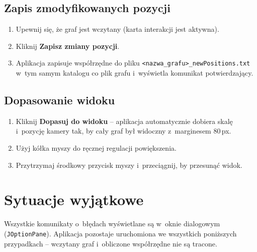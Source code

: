 \documentclass[12pt,a4paper]{article}
\begin{document}
\subsection{Zapis zmodyfikowanych pozycji}
\begin{enumerate}
    \item Upewnij się, że graf jest wczytany (karta interakcji jest aktywna).
    \item Kliknij \textbf{Zapisz zmiany pozycji}.
    \item Aplikacja zapisuje współrzędne do pliku \texttt{<nazwa\_grafu>\_newPositions.txt} w~tym samym katalogu co plik grafu i~wyświetla komunikat potwierdzający.
\end{enumerate}

\subsection{Dopasowanie widoku}
\begin{enumerate}
    \item Kliknij \textbf{Dopasuj do widoku} -- aplikacja automatycznie dobiera skalę i~pozycję kamery tak, by cały graf był widoczny z~marginesem 80\,px.
    \item Użyj kółka myszy do ręcznej regulacji powiększenia.
    \item Przytrzymaj środkowy przycisk myszy i~przeciągnij, by przesunąć widok.
\end{enumerate}

\section{Sytuacje wyjątkowe}

Wszystkie komunikaty o~błędach wyświetlane są w~oknie dialogowym (\texttt{JOptionPane}). Aplikacja pozostaje uruchomiona we wszystkich poniższych przypadkach -- wczytany graf i~obliczone współrzędne nie są tracone.
\end{document}

